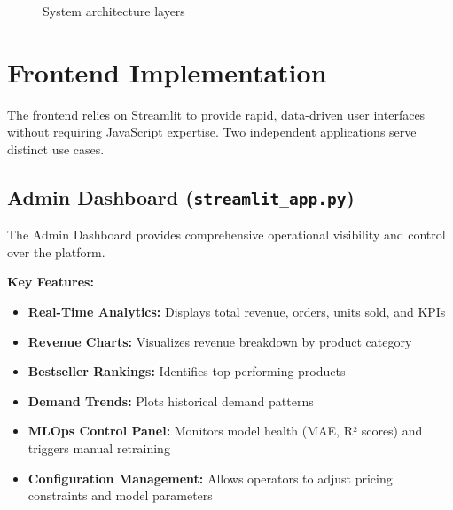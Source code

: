\documentclass[12pt,a4paper]{report}
\begin{document}
\begin{figure}[H]
    \centering
    \caption{System architecture layers}
\end{figure}

\chapter{Frontend Implementation}

The frontend relies on Streamlit to provide rapid, data-driven user interfaces without requiring JavaScript expertise. Two independent applications serve distinct use cases.

\section{Admin Dashboard (\texttt{streamlit\_app.py})}

The Admin Dashboard provides comprehensive operational visibility and control over the platform.

\textbf{Key Features:}
\begin{itemize}[leftmargin=2em]
    \item \textbf{Real-Time Analytics:} Displays total revenue, orders, units sold, and KPIs
    \item \textbf{Revenue Charts:} Visualizes revenue breakdown by product category
    \item \textbf{Bestseller Rankings:} Identifies top-performing products
    \item \textbf{Demand Trends:} Plots historical demand patterns
    \item \textbf{MLOps Control Panel:} Monitors model health (MAE, R² scores) and triggers manual retraining
    \item \textbf{Configuration Management:} Allows operators to adjust pricing constraints and model parameters
\end{itemize}
\end{document}
